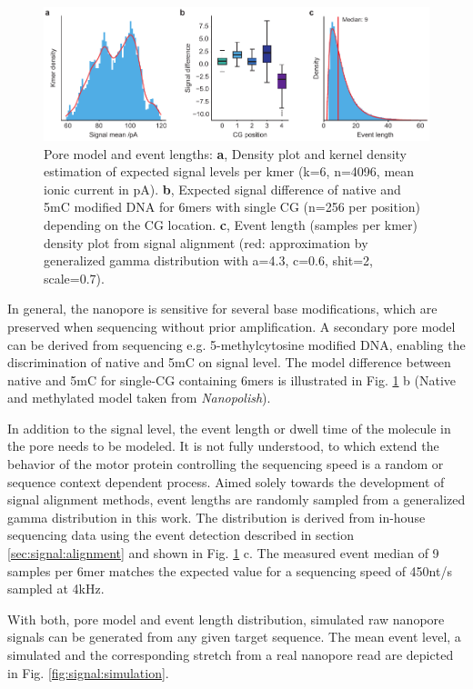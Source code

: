 \begin{figure}[h]
	\centering
	\includegraphics[width=1.0\textwidth]{figures/signal/pm.pdf}
	\captionsetup{format=plain}
	\caption[Pore model and event length]{Pore model and event lengths: \textbf{a}, Density plot and kernel density estimation of expected signal levels per kmer (k=6, n=4096, mean ionic current in pA). \textbf{b}, Expected signal difference of native and 5mC modified DNA for 6mers with single CG (n=256 per position) depending on the CG location. \textbf{c}, Event length (samples per kmer) density plot from signal alignment (red: approximation by generalized gamma distribution with a=4.3, c=0.6, shit=2, scale=0.7).}
	\label{fig:signal:pm}
\end{figure}

In general, the nanopore is sensitive for several base modifications, which are preserved when sequencing without prior amplification. A secondary pore model can be derived from sequencing e.g. 5-methylcytosine modified DNA, enabling the discrimination of native and 5mC on signal level. The model difference between native and 5mC for single-CG containing 6mers is illustrated in Fig. \ref{fig:signal:pm} b (Native and methylated model taken from \textit{Nanopolish}).

In addition to the signal level, the event length or dwell time of the molecule in the pore needs to be modeled. It is not fully understood, to which extend the behavior of the motor protein controlling the sequencing speed is a random or sequence context dependent process. Aimed solely towards the development of signal alignment methods, event lengths are randomly sampled from a generalized gamma distribution in this work. 
The distribution is derived from in-house sequencing data using the event detection described in section \ref{sec:signal:alignment} and shown in Fig. \ref{fig:signal:pm} c. The measured event median of 9 samples per 6mer matches the expected value for a sequencing speed of 450nt/s sampled at 4kHz.

With both, pore model and event length distribution, simulated raw nanopore signals can be generated from any given target sequence. The mean event level, a simulated and the corresponding stretch from a real nanopore read are depicted in Fig. \ref{fig:signal:simulation}.

